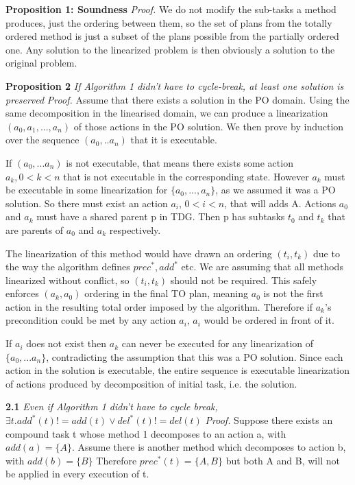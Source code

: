 	
\textbf{Proposition 1: Soundness}  \newline
\textit{Proof.}
We do not modify the sub-tasks a method produces, just the ordering between them, so the set of plans from the totally ordered method is just a subset of the plans possible from the partially ordered one. Any solution to the linearized problem is then obviously a solution to the original problem.



\textbf{Proposition 2} \textit{If Algorithm 1 didn't have to cycle-break, at least one solution is preserved} \newline
\textit{Proof.}
	Assume that there exists a solution in the PO domain. Using the same decomposition in the linearised domain, we can produce a linearization $(a_0, a_1, ..., a_n)$ of those actions in the PO solution. We then prove by induction over the sequence $(a_0, .. a_n)$ that it is executable.
 
	If $(a_0, ... a_n)$ is not executable, that means there exists some action $a_k,  0 < k < n$ that is not executable in the corresponding state.
	However $a_k$ must be executable in some linearization for $\{a_0, ..., a_n\}$, as we assumed it was a PO solution. So there must exist an action $a_i$, $0 < i < n$, that will adds A. Actions $a_0$ and $a_k$ must have a shared parent p in TDG. Then p has subtasks $t_0$ and $t_k$ that are parents of $a_0$ and $a_k$ respectively. 
	
	The linearization of this method would have drawn an ordering $(t_i, t_k)$ due to the way the algorithm defines $prec^{*}, add^{*}$ etc. We are assuming that all methods linearized without conflict, so $(t_i, t_k)$ should not be required. This safely enforces $(a_k, a_0)$ ordering in the final TO plan, meaning $a_0$ is not the first action in the resulting total order imposed by the algorithm. Therefore if $a_k$’s precondition could be met by any action $a_i$, $a_i$ would be ordered in front of it. 
	
	If $a_i$ does not exist then $a_k$ can never be executed for any linearization of $\{a_0, ...a_n\}$, contradicting the assumption that this was a PO solution. Since each action in the solution is executable, the entire sequence is executable linearization of actions produced by decomposition of initial task, i.e. the solution.
	

\textbf{2.1} \textit{Even if Algorithm 1 didn't have to cycle break, $\exists t. add^{*}(t) != add(t) \lor del^{*}(t) != del(t) $ }\newline
\textit{Proof.}
Suppose there exists an compound task t whose method 1 decomposes to an action a, with $add(a) = \{A\}$.
Assume there is another method which decomposes to action b, with $add(b) = \{B\}$
Therefore $prec^{*}(t) =\{A, B\} $ but both A and B, will not be applied in every execution of t.


